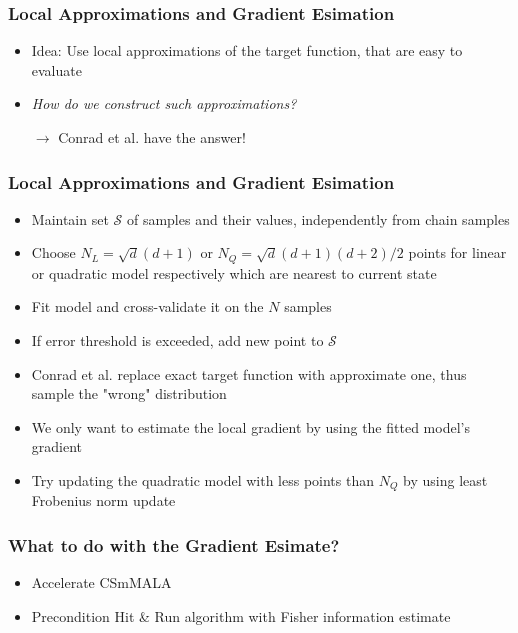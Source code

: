 \begin{frame}[c]
    \frametitle{Local Approximations and Gradient Esimation}
    \begin{itemize}
        \item Idea: Use local approximations of the target function, that are easy to evaluate
        \item \emph{How do we construct such approximations?}
        \item[$\to$] Conrad et al. have the answer! \cite{Conrad2016}
    \end{itemize}
\end{frame}

\begin{frame}[c]
    \frametitle{Local Approximations and Gradient Esimation}
    \begin{itemize}
        \item Maintain set $\mathcal{S}$ of samples and their values, independently from chain samples
        \item Choose $N_L = \sqrt{d} (d + 1)$ or $N_Q= \sqrt{d} (d + 1)(d + 2) / 2$ points for linear or quadratic model respectively which are nearest to current state
        \item Fit model and cross-validate it on the $N$ samples
        \item If error threshold is exceeded, add new point to $\mathcal{S}$
        \item[]
        \item Conrad et al. \cite{Conrad2016} replace exact target function with approximate one, thus sample the "wrong" distribution
        \item We only want to estimate the local gradient by using the fitted model's gradient
        \item Try updating the quadratic model with less points than $N_Q$ by using least Frobenius norm update \cite{Powell2004}
    \end{itemize}
\end{frame}

\begin{frame}[c]
    \frametitle{What to do with the Gradient Esimate?}
    \begin{itemize}
        \item Accelerate CSmMALA
        \item Precondition Hit \& Run algorithm with Fisher information estimate
    \end{itemize}
\end{frame}

